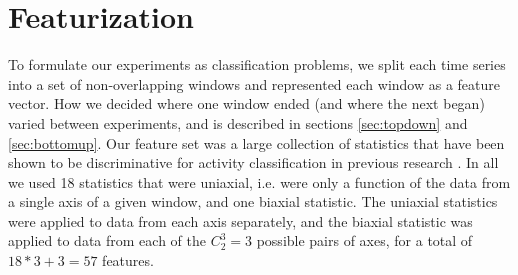 \section{Featurization}
To formulate our experiments as classification problems, we split each time series into a set of
non-overlapping windows and represented each window as a feature vector.
How we decided where one window ended (and where the next began) varied between
experiments, and is described in sections \ref{sec:topdown} and \ref{sec:bottomup}. Our feature
set was a large collection of statistics that have been shown to be discriminative
for activity classification in previous research \cite{li09} \cite{rothney07}
\cite{staudenmeyer09} \cite{zheng12}. In all we used 18 statistics that were
uniaxial, i.e. were only a function of the data from a single axis of a given window,
and one biaxial statistic.
The uniaxial statistics were applied to data from each axis separately, and
the biaxial statistic was applied to data from each of the $C_2^3=3$ possible pairs of
axes, for a total of $18*3+3 = 57$ features.

